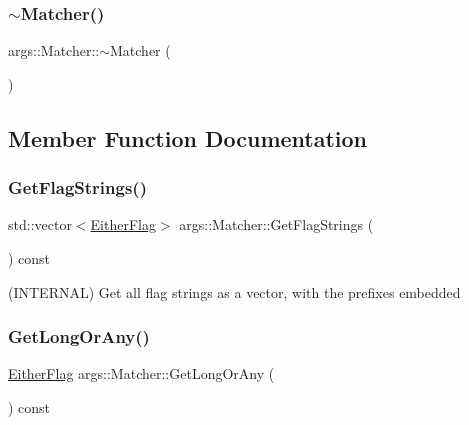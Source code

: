 \mbox{\label{classargs_1_1_matcher_acb9ecd5c9f54e07e5457dcabbfb8d9cd}} 
\subsubsection{\texorpdfstring{$\sim$\+Matcher()}{~Matcher()}}
{\footnotesize\ttfamily args\+::\+Matcher\+::$\sim$\+Matcher (\begin{DoxyParamCaption}{ }\end{DoxyParamCaption})\hspace{0.3cm}{\ttfamily [inline]}}



\subsection{Member Function Documentation}
\mbox{\label{classargs_1_1_matcher_a3b90feb46bb0d504072344e8bced8cd5}} 
\subsubsection{\texorpdfstring{Get\+Flag\+Strings()}{GetFlagStrings()}}
{\footnotesize\ttfamily std\+::vector$<$\hyperlink{structargs_1_1_either_flag}{Either\+Flag}$>$ args\+::\+Matcher\+::\+Get\+Flag\+Strings (\begin{DoxyParamCaption}{ }\end{DoxyParamCaption}) const\hspace{0.3cm}{\ttfamily [inline]}}

(I\+N\+T\+E\+R\+N\+AL) Get all flag strings as a vector, with the prefixes embedded \mbox{\label{classargs_1_1_matcher_ab3668d21d135ca54f966b935a5251836}} 
\subsubsection{\texorpdfstring{Get\+Long\+Or\+Any()}{GetLongOrAny()}}
{\footnotesize\ttfamily \hyperlink{structargs_1_1_either_flag}{Either\+Flag} args\+::\+Matcher\+::\+Get\+Long\+Or\+Any (\begin{DoxyParamCaption}{ }\end{DoxyParamCaption}) const\hspace{0.3cm}{\ttfamily [inline]}}

